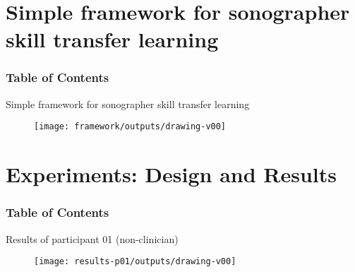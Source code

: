{%
\section{Simple framework for sonographer skill transfer learning}
\begin{frame}
      \frametitle{Table of Contents}
      \tableofcontents[currentsection]
\end{frame}

{

\begin{frame}{Simple framework for sonographer skill transfer learning}{}

      \begin{figure}
        \centering
        \texttt{[image: framework/outputs/drawing-v00]}
      \end{figure}
\end{frame}
}



\section{Experiments: Design and Results}
\begin{frame}
      \frametitle{Table of Contents}
      \tableofcontents[currentsection]
  \end{frame}

{

\begin{frame}{Results of participant 01 (non-clinician)}{}

      \begin{figure}
        \centering
        \texttt{[image: results-p01/outputs/drawing-v00]}
      \end{figure}
\end{frame}
}


}
